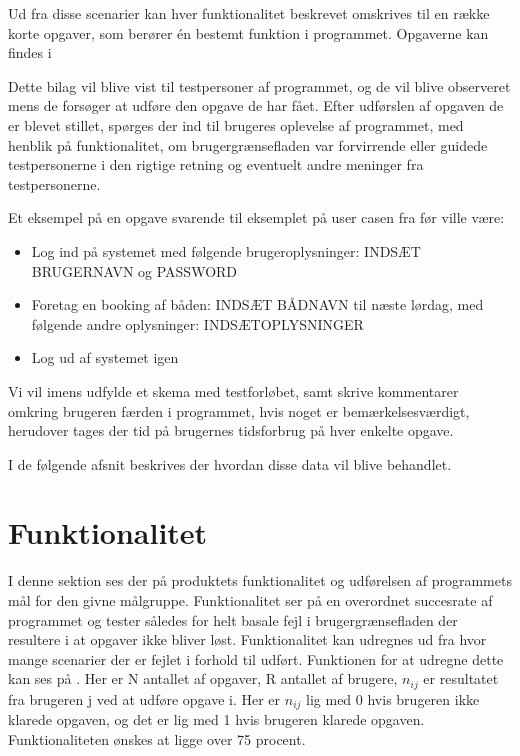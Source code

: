 Ud fra disse scenarier kan hver funktionalitet beskrevet omskrives til en række korte opgaver, som berører én bestemt funktion i programmet. Opgaverne kan findes i 

Dette bilag vil blive vist til testpersoner af programmet, og de vil blive observeret mens de forsøger at udføre den opgave de har fået. Efter udførslen af opgaven de er blevet stillet, spørges der ind til brugeres oplevelse af programmet, med henblik på funktionalitet, om brugergrænsefladen var forvirrende eller guidede testpersonerne i den rigtige retning og eventuelt andre meninger fra testpersonerne.

Et eksempel på en opgave svarende til eksemplet på user casen fra før ville være:

\begin{itemize}
\item Log ind på systemet med følgende brugeroplysninger: INDSÆT BRUGERNAVN og PASSWORD
\item Foretag en booking af båden: INDSÆT BÅDNAVN til næste lørdag, med følgende andre oplysninger: INDSÆTOPLYSNINGER
\item Log ud af systemet igen
\end{itemize}

Vi vil imens udfylde et skema med testforløbet, samt skrive kommentarer omkring brugeren færden i programmet, hvis noget er bemærkelsesværdigt, herudover tages der tid på brugernes tidsforbrug på hver enkelte opgave.

I de følgende afsnit beskrives der hvordan disse data vil blive behandlet.
\cbend
{}

\section{Funktionalitet}
I denne sektion ses der på produktets funktionalitet og udførelsen af programmets mål for den givne målgruppe. Funktionalitet ser på en overordnet succesrate af programmet og tester således for helt basale fejl i brugergrænsefladen der resultere i at opgaver ikke bliver løst. Funktionalitet kan udregnes ud fra hvor mange scenarier der er fejlet i forhold til udført. Funktionen for at udregne dette kan ses på . Her er N antallet af opgaver, R antallet af brugere, $n_{ij}$ er resultatet fra brugeren j ved at udføre opgave i. Her er $n_{ij}$ lig med 0 hvis brugeren ikke klarede opgaven, og det er lig med 1 hvis brugeren klarede opgaven. Funktionaliteten ønskes at ligge over 75 procent.\citep{UIEffectiveness}

